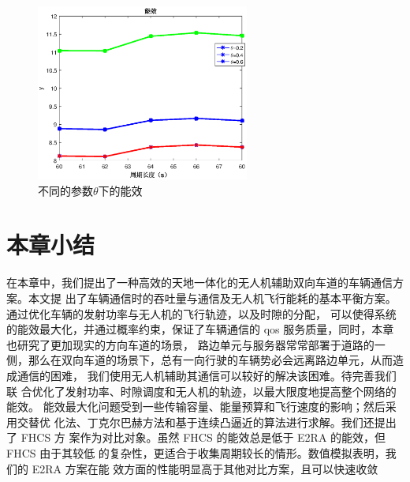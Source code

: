 \begin{figure}[H]
\centering
\includegraphics[width=7cm]{figures//chap4//untitled.eps}
\caption{不同的参数$\theta$下的能效}
\label{不同的参数untitled下的能效}
\end{figure}
\section{本章小结}\label{section4-6}

在本章中，我们提出了一种高效的天地一体化的无人机辅助双向车道的车辆通信方案。本文提
出了车辆通信时的吞吐量与通信及无人机飞行能耗的基本平衡方案。通过优化车辆的发射功率与无人机的飞行轨迹，以及时隙的分配，
可以使得系统的能效最大化，并通过概率约束，保证了车辆通信的 qos 服务质量，同时，本章也研究了更加现实的方向车道的场景，
路边单元与服务器常常部署于道路的一侧，那么在双向车道的场景下，总有一向行驶的车辆势必会远离路边单元，从而造成通信的困难，
我们使用无人机辅助其通信可以较好的解决该困难。\textcolor[RGB]{18,220,168}{待完善我们联
合优化了发射功率、时隙调度和无人机的轨迹，以最大限度地提高整个网络的能效。
能效最大化问题受到一些传输容量、能量预算和飞行速度的影响；然后采用交替优
化法、丁克尔巴赫方法和基于连续凸逼近的算法进行求解。我们还提出了 FHCS 方
案作为对比对象。虽然 FHCS 的能效总是低于 E2RA 的能效，但 FHCS 由于其较低
的复杂性，更适合于收集周期较长的情形。数值模拟表明，我们的 E2RA 方案在能
效方面的性能明显高于其他对比方案，且可以快速收敛}


